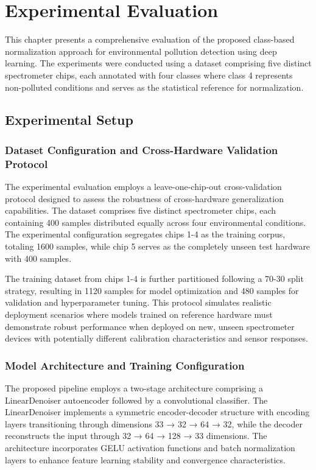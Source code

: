 \chapter{Experimental Evaluation}

This chapter presents a comprehensive evaluation of the proposed class-based normalization approach for environmental pollution detection using deep learning. The experiments were conducted using a dataset comprising five distinct spectrometer chips, each annotated with four classes where class 4 represents non-polluted conditions and serves as the statistical reference for normalization.

\section{Experimental Setup}

\subsection{Dataset Configuration and Cross-Hardware Validation Protocol}

The experimental evaluation employs a leave-one-chip-out cross-validation protocol designed to assess the robustness of cross-hardware generalization capabilities. The dataset comprises five distinct spectrometer chips, each containing 400 samples distributed equally across four environmental conditions. The experimental configuration segregates chips 1-4 as the training corpus, totaling 1600 samples, while chip 5 serves as the completely unseen test hardware with 400 samples.

The training dataset from chips 1-4 is further partitioned following a 70-30 split strategy, resulting in 1120 samples for model optimization and 480 samples for validation and hyperparameter tuning. This protocol simulates realistic deployment scenarios where models trained on reference hardware must demonstrate robust performance when deployed on new, unseen spectrometer devices with potentially different calibration characteristics and sensor responses.

\subsection{Model Architecture and Training Configuration}

The proposed pipeline employs a two-stage architecture comprising a LinearDenoiser autoencoder followed by a convolutional classifier. The LinearDenoiser implements a symmetric encoder-decoder structure with encoding layers transitioning through dimensions 33 → 32 → 64 → 32, while the decoder reconstructs the input through 32 → 64 → 128 → 33 dimensions. The architecture incorporates GELU activation functions and batch normalization layers to enhance feature learning stability and convergence characteristics.


